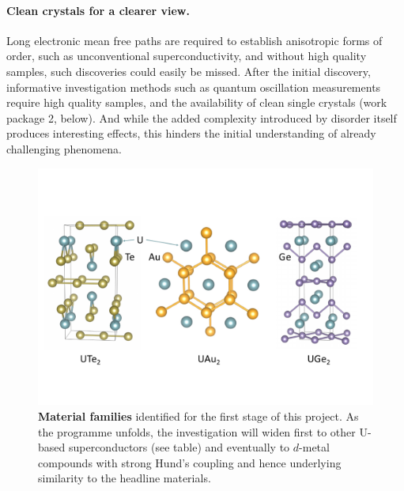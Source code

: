 \paragraph{Clean crystals for a clearer view.} Long electronic mean free paths are required to establish anisotropic forms of order, such as unconventional superconductivity, and without high quality samples, such discoveries could easily be missed. After the initial discovery, informative investigation methods such as quantum oscillation measurements require high quality samples, and the availability of clean single crystals  (work package 2, below). And while the added complexity introduced by disorder itself produces interesting effects, this hinders the initial understanding of already challenging phenomena. %


\begin{figure}[t]
  \centerline{\includegraphics[width=\columnwidth]{Figures/Structures.pdf}}
  
     \caption{{\bf Material families} identified for the first stage of this project. As the programme unfolds, the investigation will widen first to other U-based superconductors (see table) and eventually to $d$-metal compounds with strong Hund's coupling and hence underlying similarity to the headline materials. }
     
      \label{fig:Materials}
  \end{figure}
  
 
  
